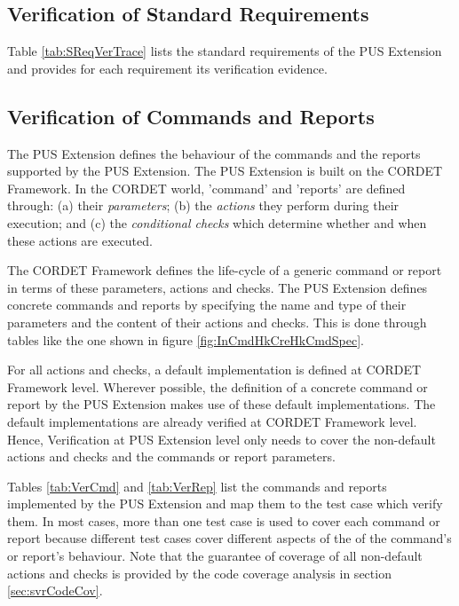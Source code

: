 \documentclass{pnp_article}
\begin{document}
\subsection{Verification of Standard Requirements}\label{sec:svrVerStdReq}
Table \ref{tab:SReqVerTrace} lists the standard requirements of the PUS Extension and provides for each requirement its verification evidence.


\subsection{Verification of Commands and Reports}\label{sec:svrVerCmdReps}
The PUS Extension defines the behaviour of the commands and the reports supported by the PUS Extension. The PUS Extension is built on the CORDET Framework. In the CORDET world, 'command' and 'reports' are defined through: (a) their \textit{parameters}; (b) the \textit{actions} they perform during their execution; and (c) the \textit{conditional checks} which determine whether and when these actions are executed. 

The CORDET Framework defines the life-cycle of a generic command or report in terms of these parameters, actions and checks. The PUS Extension defines concrete commands and reports by specifying the name and type of their parameters and the content of their actions and checks. This is done through tables like the one shown in figure \ref{fig:InCmdHkCreHkCmdSpec}. 


For all actions and checks, a default implementation is defined at CORDET Framework level. Wherever possible, the definition of a concrete command or report by the PUS Extension makes use of these default implementations. The default implementations are already verified at CORDET Framework level. Hence, Verification at PUS Extension level only needs to cover the non-default actions and checks and the commands or report parameters.

Tables \ref{tab:VerCmd} and \ref{tab:VerRep} list the commands and reports implemented by the PUS Extension and map them to the test case which verify them. In most cases, more than one test case is used to cover each command or report because different test cases cover different aspects of the of the command's or report's behaviour. Note that the guarantee of coverage of all non-default actions and checks is provided by the code coverage analysis in section \ref{sec:svrCodeCov}.
\end{document}

